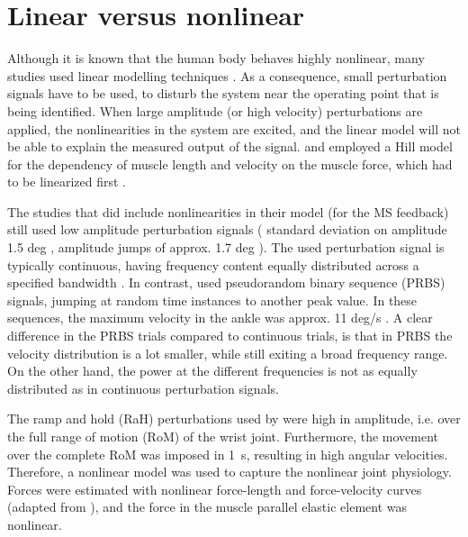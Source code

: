 \section{Linear versus nonlinear}
Although it is known that the human body behaves highly nonlinear, many studies used linear modelling techniques \cite{van_der_helm_identification_2002, schouten_nmclab_2008, mugge_rigorous_2010}. As a consequence, small perturbation signals have to be used, to disturb the system near the operating point that is being identified. When large amplitude (or high velocity) perturbations are applied, the nonlinearities in the system are excited, and the linear model will not be able to explain the measured output of the signal. \citeauthor{schouten_nmclab_2008} and \citeauthor{mugge_rigorous_2010} employed a Hill model for the dependency of muscle length and velocity on the muscle force, which had to be linearized first \cite{schouten_nmclab_2008, mugge_rigorous_2010}.

The studies that did include nonlinearities in their model (for the MS feedback) still used low amplitude perturbation signals (\citeauthor{zhang_simultaneous_1997} standard deviation on amplitude 1.5 deg \cite{zhang_simultaneous_1997}, \citeauthor{mirbagheri_intrinsic_2000} amplitude jumps of approx. 1.7 deg \cite{mirbagheri_intrinsic_2000}). The used perturbation signal is typically continuous, having frequency content equally distributed across a specified bandwidth \cite{zhang_simultaneous_1997, van_der_helm_identification_2002, schouten_nmclab_2008, mugge_sensory_2009}. In contrast, \citeauthor{mirbagheri_intrinsic_2000} used pseudorandom binary sequence (PRBS) signals, jumping at random time instances to another peak value. In these sequences, the maximum velocity in the ankle was approx. 11 deg/s \cite{mirbagheri_intrinsic_2000}. A clear difference in the PRBS trials compared to continuous trials, is that in PRBS the velocity distribution is a lot smaller, while still exiting a broad frequency range. On the other hand, the power at the different frequencies is not as equally distributed as in continuous perturbation signals. 

The ramp and hold (RaH) perturbations used by \citeauthor{de_gooijer-van_de_groep_estimation_2016} were high in amplitude, i.e. over the full range of motion (RoM) of the wrist joint. Furthermore, the movement over the complete RoM was imposed in \SI{1}{\second}, resulting in high angular velocities. Therefore, a nonlinear model was used to capture the nonlinear joint physiology. Forces were estimated with nonlinear force-length and force-velocity curves (adapted from \cite{thelen_adjustment_2003}), and the force in the muscle parallel elastic element was nonlinear. 




